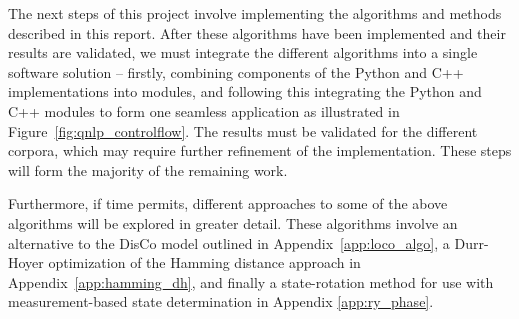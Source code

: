 The next steps of this project involve implementing the algorithms and methods described in this report. After these algorithms have been implemented and their results are validated, we must integrate the different algorithms into a single software solution -- firstly, combining components of the Python and C++ implementations into modules, and following this integrating the Python and C++ modules to form one seamless application as illustrated in Figure~\ref{fig:qnlp_controlflow}. The results must be validated for the different corpora, which may require further refinement of the implementation. These steps will form the majority of the remaining work.

Furthermore, if time permits, different approaches to some of the above algorithms will be explored in greater detail. These algorithms involve an alternative to the DisCo model outlined in Appendix~\ref{app:loco_algo}, a Durr-Hoyer optimization of the Hamming distance approach in Appendix~\ref{app:hamming_dh}, and finally a state-rotation method for use with measurement-based state determination in Appendix \ref{app:ry_phase}.